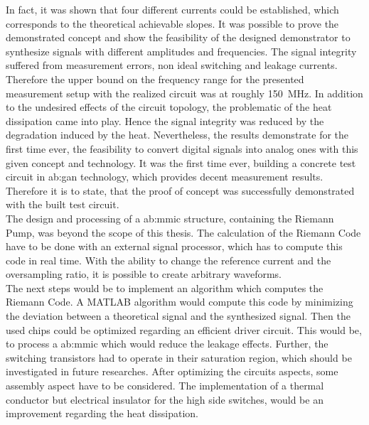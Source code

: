 In fact, it was shown that four different currents could be established, which corresponds to the theoretical achievable slopes.
It was possible to prove the demonstrated concept and show the feasibility of the designed demonstrator to synthesize signals with different amplitudes and frequencies.
The signal integrity suffered from measurement errors, non ideal switching and leakage currents.
Therefore the upper bound on the frequency range for the presented measurement setup with the realized circuit was at roughly \SI{150}{\mega \hertz}.
In addition to the undesired effects of the circuit topology, the problematic of the heat dissipation came into play.
Hence the signal integrity was reduced by the degradation induced by the heat.
Nevertheless, the results demonstrate for the first time ever, the feasibility to convert digital signals into analog ones with this given concept and technology.
It was the first time ever, building a concrete test circuit in \gls{ab:gan} technology, which provides decent measurement results.
Therefore it is to state, that the proof of concept was successfully demonstrated with the built test circuit.\\
The design and processing of a \gls{ab:mmic} structure, containing the Riemann Pump, was beyond the scope of this thesis.
The calculation of the Riemann Code have to be done with an external signal processor, which has to compute this code in real time. 
With the ability to change the reference current and the oversampling ratio, it is possible to create arbitrary waveforms.\\
The next steps would be to implement an algorithm which computes the Riemann Code.
A MATLAB algorithm would compute this code by minimizing the deviation 
between a theoretical signal and the synthesized signal.
Then the used chips could be optimized regarding an efficient driver circuit.
This would be, to process a \gls{ab:mmic} which would reduce the leakage effects.
Further, the switching transistors had to operate in their saturation region, which should be investigated in future researches.
After optimizing the circuits aspects, some assembly aspect have to be considered.
The implementation of a thermal conductor but electrical insulator for the high side switches, would be an improvement regarding the heat dissipation.


